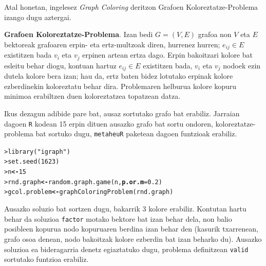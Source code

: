 \documentclass[eu]{ifirak}\usepackage[]{graphicx}\usepackage[]{color}
\makeatletter
\newcommand{\hlnum}[1]{\textcolor[rgb]{0.659,0.4,0.051}{#1}}%
\newcommand{\hlstr}[1]{\textcolor[rgb]{0.659,0.4,0.051}{#1}}%
\newcommand{\hlstd}[1]{\textcolor[rgb]{0,0,0}{#1}}%
\newcommand{\hlkwb}[1]{\textcolor[rgb]{0.549,0.114,0.412}{\textbf{#1}}}%
\newcommand{\hlkwc}[1]{\textcolor[rgb]{0.659,0.573,0.133}{\textbf{#1}}}%
\newcommand{\hlkwd}[1]{\textcolor[rgb]{0.659,0.133,0.482}{#1}}%
\newenvironment{kframe}{%
 \def\at@end@of@kframe{}%
 \ifinner\ifhmode%
  \def\at@end@of@kframe{\end{minipage}}%
  \begin{minipage}{\columnwidth}%
 \fi\fi%
 \def\FrameCommand##1{\hskip\@totalleftmargin \hskip-\fboxsep
 \colorbox{shadecolor}{##1}\hskip-\fboxsep
     \hskip-\linewidth \hskip-\@totalleftmargin \hskip\columnwidth}%
 \MakeFramed {\advance\hsize-\width
   \@totalleftmargin\z@ \linewidth\hsize
   \@setminipage}}%
 {\par\unskip\endMakeFramed%
 \at@end@of@kframe}
\newenvironment{knitrout}{}{} %
\newcommand{\code}[1]{\texttt{#1}}
\makeatother
\begin{document}
Atal honetan, ingelesez \textit{Graph Coloring} deritzon Grafoen Koloreztatze-Problema izango dugu aztergai.

\begin{ifdefinition} {\bf Grafoen Koloreztatze-Problema}. Izan bedi $G=(V,E)$ grafoa non $V$ eta $E$ bektoreak grafoaren erpin- eta ertz-multzoak diren, hurrenez hurren; $e_{ij}\in E$ existitzen bada $v_i$ eta $v_j$ erpinen artean ertza dago. Erpin bakoitzari kolore bat esleitu behar diogu, kontuan hartuz $e_{ij}\in E$ existitzen bada, $v_i$ eta $v_j$ nodoek ezin dutela kolore bera izan; hau da, ertz baten bidez lotutako erpinak kolore ezberdinekin koloreztatu behar dira. Problemaren helburua kolore kopuru minimoa erabiltzen duen koloreztatzea topatzean datza.
\end{ifdefinition}

Ikus dezagun adibide pare bat, ausaz sortutako grafo bat erabiliz. Jarraian dagoen \code{R} kodean 15 erpin dituen ausazko grafo bat sortu ondoren, koloreztatze-problema bat sortuko dugu, \code{metaheuR} paketean dagoen funtzioak erabiliz.

\begin{knitrout}
\color{fgcolor}\begin{kframe}
\begin{alltt}
\hlstd{> }\hlkwd{library}\hlstd{(}\hlstr{"igraph"}\hlstd{)}
\hlstd{> }\hlkwd{set.seed}\hlstd{(}\hlnum{1623}\hlstd{)}
\hlstd{> }\hlstd{n} \hlkwb{<-} \hlnum{15}
\hlstd{> }\hlstd{rnd.graph} \hlkwb{<-} \hlkwd{random.graph.game}\hlstd{(n,} \hlkwc{p.or.m}\hlstd{=}\hlnum{0.2}\hlstd{)}
\hlstd{> }\hlstd{gcol.problem} \hlkwb{<-} \hlkwd{graphColoringProblem}\hlstd{(rnd.graph)}
\end{alltt}
\end{kframe}
\end{knitrout}

Ausazko soluzio bat sortzen dugu, bakarrik 3 kolore erabiliz. Kontutan hartu behar da soluzioa \code{factor} motako bektore bat izan behar dela, non balio posibleen kopurua nodo kopuruaren berdina izan behar den (kasurik txarrenean, grafo osoa denean, nodo bakoitzak kolore ezberdin bat izan beharko du). Ausazko soluzioa ea bideragarria denetz egiaztatuko dugu, problema definitzean \code{valid} sortutako funtzioa erabiliz.
\end{document}
